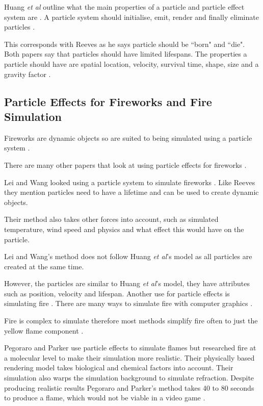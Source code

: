 \documentclass{scrartcl}
\begin{document}
Huang \textit{et al} outline what the main properties of a particle and particle effect system are \cite{Huang}.
A particle system should initialise, emit, render and finally eliminate particles \cite{Huang}.

This corresponds with Reeves as he says particle should be ``born" and ``die". Both papers say that particles should have limited lifespans.
The properties a particle should have are spatial location, velocity, survival  time, shape, size and a gravity factor \cite{Huang}.

\subsection{Particle Effects for Fireworks and Fire Simulation}
Fireworks are dynamic objects so are suited to being simulated using a particle system \cite{Lei, Reeves}.

There are many other papers that look at using particle effects for fireworks \cite{Lei, Dong, Zhang}.

Lei and Wang looked using a particle system to simulate fireworks \cite{Lei}. Like Reeves they mention particles need to have a lifetime and can be used to create dynamic objects.

Their method also takes other forces into account, such as simulated temperature, wind speed and physics and what effect this would have on the particle\cite{Lei}.

Lei and Wang's method does not follow Huang \textit{et al}'s model as all particles are created at the same time.

However, the particles are similar to Huang \textit{et al}'s model, they have attributes such as position, velocity and lifespan.
\bigskip
Another use for particle effects is simulating fire \cite{Pegoraro}. There are many ways to simulate fire with computer graphics \cite{BridaultLouchez, Beaudoin, Lamorlette}.

Fire is complex to simulate therefore most methods simplify fire often to just the yellow flame component \cite{Pegoraro}. 

Pegoraro and Parker use particle effects to simulate flames but researched fire at a molecular level to make their simulation more realistic. Their physically based rendering model takes biological and chemical factors into account. Their simulation also warps the simulation background to simulate refraction.  Despite producing realistic results Pegoraro and Parker's method takes 40 to 80 seconds to produce a flame, which would not be viable in a video game \cite{Pegoraro}.
\end{document}
